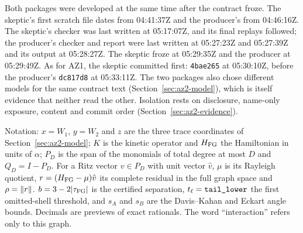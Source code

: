 Both packages were developed at the same time after the contract froze. The
skeptic's first scratch file dates from 04:41:37Z and the producer's from
04:46:16Z. The skeptic's checker was last written at 05:17:07Z, and its final
replays followed; the producer's checker and report were last written at
05:27:23Z and 05:27:39Z and its output at 05:28:27Z. The skeptic froze at
05:29:35Z and the producer at 05:29:49Z. As for AZ1, the skeptic committed
first: \texttt{4bae265} at 05:30:10Z, before the producer's \texttt{dc817d8}
at 05:33:11Z. The two packages also chose different models for the same
contract text (Section~\ref{sec:az2-model}), which is itself evidence that
neither read the other. Isolation rests on disclosure, name-only exposure,
content and commit order (Section~\ref{sec:az2-evidence}).

Notation: $x=W_1$, $y=W_2$ and $z$ are the three trace coordinates of
Section~\ref{sec:az2-model}; $K$ is the kinetic operator and $H_{\rm FG}$ the
Hamiltonian in units of $\alpha$; $P_D$ is the span of the monomials of total
degree at most $D$ and $Q_D=I-P_D$. For a Ritz vector $v\in P_D$ with unit
vector $\hat v$, $\mu$ is its Rayleigh quotient,
$r=(H_{\rm FG}-\mu)\hat v$ its complete residual in the full graph space and
$\rho=\left\lVert r\right\rVert$. $b=3-2|\tau_{\mathrm{FG}}|$ is the certified separation,
$t_\ell=\recid{tail_lower}$ the first omitted-shell threshold, and $s_A$ and
$s_B$ are the Davis--Kahan and Eckart angle bounds. Decimals are previews of
exact rationals. The word ``interaction'' refers only to this graph.

